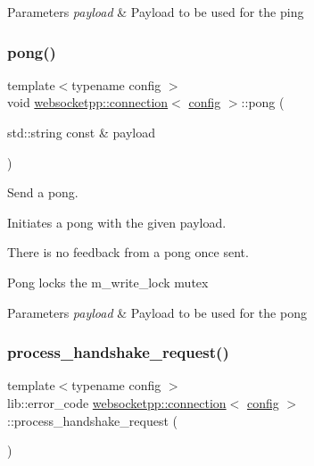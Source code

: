 \begin{DoxyParams}{Parameters}
{\em payload} & Payload to be used for the ping \\
\hline
\end{DoxyParams}
\mbox{\label{classwebsocketpp_1_1connection_aa8684fcfd9a57466ae1b52e36b834408}} 
\subsubsection{\texorpdfstring{pong()}{pong()}}
{\footnotesize\ttfamily template$<$typename config $>$ \\
void \mbox{\hyperlink{classwebsocketpp_1_1connection}{websocketpp\+::connection}}$<$ \mbox{\hyperlink{classconfig}{config}} $>$\+::pong (\begin{DoxyParamCaption}\item[{std\+::string const \&}]{payload }\end{DoxyParamCaption})}



Send a pong. 

Initiates a pong with the given payload.

There is no feedback from a pong once sent.

Pong locks the m\+\_\+write\+\_\+lock mutex


\begin{DoxyParams}{Parameters}
{\em payload} & Payload to be used for the pong \\
\hline
\end{DoxyParams}
\mbox{\label{classwebsocketpp_1_1connection_a569483c7dcf542f500f6e9f49d803010}} 
\subsubsection{\texorpdfstring{process\+\_\+handshake\+\_\+request()}{process\_handshake\_request()}}
{\footnotesize\ttfamily template$<$typename config $>$ \\
lib\+::error\+\_\+code \mbox{\hyperlink{classwebsocketpp_1_1connection}{websocketpp\+::connection}}$<$ \mbox{\hyperlink{classconfig}{config}} $>$\+::process\+\_\+handshake\+\_\+request (\begin{DoxyParamCaption}{ }\end{DoxyParamCaption})\hspace{0.3cm}{\ttfamily [protected]}}

